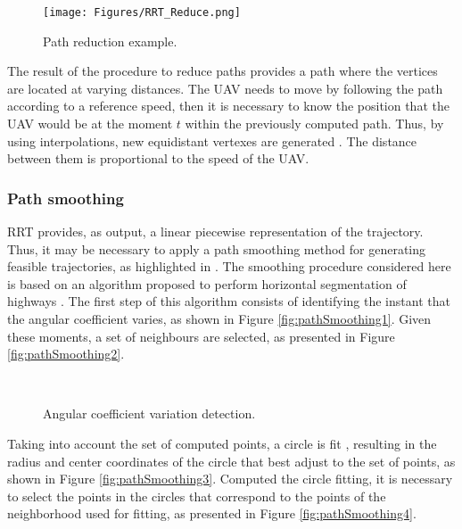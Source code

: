 \begin{figure}[hbt!]
\centering
\texttt{[image: Figures/RRT\_Reduce.png]}
\caption{Path reduction example.}
\label{fig:pathReduce}
\end{figure}

The result of the procedure to reduce paths provides a path where the vertices are located at varying distances. The UAV needs to move by following the path according to a reference speed, then it is necessary to know the position that the UAV would be at the moment $t$ within the previously computed path. Thus, by using interpolations, new equidistant vertexes are generated \cite{davis_1975}. The distance between them is proportional to the speed of the UAV.

\subsubsection{Path smoothing}

RRT provides, as output, a linear piecewise representation of the trajectory. Thus, it may be necessary to apply a path smoothing method for generating feasible trajectories, as highlighted in \cite{borges_2016}. The smoothing procedure considered here is based on an algorithm proposed to perform horizontal segmentation of highways \cite{coelho_2015}. The first step of this algorithm consists of identifying the instant that the angular coefficient varies, as shown in Figure \ref{fig:pathSmoothing1}. Given these moments, a set of neighbours are selected, as presented in Figure \ref{fig:pathSmoothing2}. 

\begin{figure}[h!]
      \centering            
        \\ \centering
      \caption{Angular coefficient variation detection.}
\end{figure}

Taking into account the set of computed points, a circle is fit \cite{coope_1993}, resulting in the radius and center coordinates of the circle that best adjust to the set of points, as shown in Figure  \ref{fig:pathSmoothing3}. Computed the circle fitting, it is necessary to select the points in the circles that correspond to the points of the neighborhood used for fitting, as presented in Figure \ref{fig:pathSmoothing4}. 

